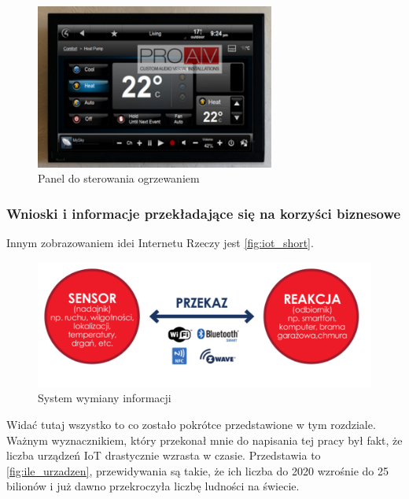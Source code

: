 \begin{figure}[!htbp]
	\centering
	\includegraphics[width=0.7\textwidth]{images/panel_ogrzewanie.png}
	\caption[Panel do sterowania ogrzewaniem.]{Panel do sterowania ogrzewaniem}
	\label{fig:panel_ogrzewanie}
\end{figure}

\subsubsection{Wnioski i informacje przekładające się na korzyści biznesowe}
\label{sec:benefits_conclusions}
Innym zobrazowaniem idei Internetu Rzeczy jest \autoref{fig:iot_short}.
\begin{figure}[!htbp]
	\centering
	\includegraphics[width=1.0\textwidth]{images/iot_short.png}
	\caption[System wymiany informacji.]{System wymiany informacji}
	\label{fig:iot_short}
\end{figure}
Widać tutaj wszystko to co zostało pokrótce przedstawione w tym rozdziale. 
Ważnym wyznacznikiem, który przekonał mnie do napisania tej pracy był fakt, że liczba urządzeń IoT drastycznie wzrasta w czasie. Przedstawia to \autoref{fig:ile_urzadzen}, przewidywania są takie, że ich liczba do 2020 wzrośnie do 25 bilionów i już dawno przekroczyła liczbę ludności na świecie. 


